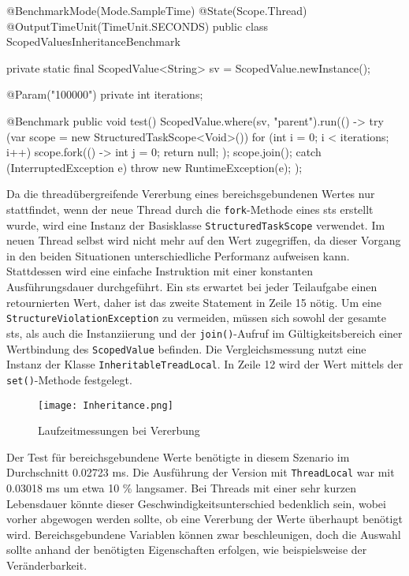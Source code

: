     \begin{program} [H]
        \caption{Laufzeit bei Vererbung}
        \label{prog:Inheritance}
    \begin{JavaCode}[language=Java, numbers=left]
@BenchmarkMode(Mode.SampleTime)
@State(Scope.Thread)
@OutputTimeUnit(TimeUnit.SECONDS)
public class ScopedValuesInheritanceBenchmark {
    private static final ScopedValue<String> sv = ScopedValue.newInstance();

    @Param({"100000"})
    private int iterations;

    @Benchmark
    public void test(){
        ScopedValue.where(sv, "parent").run(() -> {
            try (var scope = new StructuredTaskScope<Void>()) {
                for (int i = 0; i < iterations; i++) 
                    scope.fork(() -> {int j = 0; return null; });
                scope.join();
            } catch (InterruptedException e) {
                throw new RuntimeException(e);
            }
        });
    }
}\end{JavaCode}
    \end{program}
    Da die threadübergreifende Vererbung eines bereichsgebundenen Wertes nur stattfindet, wenn der neue Thread durch die \texttt{fork}-Methode eines \gls{sts} erstellt wurde, wird eine Instanz 
    der Basisklasse \texttt{StructuredTaskScope} verwendet. Im neuen Thread selbst wird nicht mehr auf
    den Wert zugegriffen, da dieser Vorgang in den beiden Situationen unterschiedliche Performanz aufweisen kann. Stattdessen wird eine einfache Instruktion mit einer konstanten Ausführungsdauer
    durchgeführt. Ein \gls{sts} erwartet bei jeder Teilaufgabe einen retournierten Wert, daher ist das zweite Statement in Zeile 15 nötig. Um eine \texttt{StructureViolationException} zu vermeiden,
    müssen sich sowohl der gesamte \gls{sts}, als auch die Instanziierung und der \texttt{join()}-Aufruf im Gültigkeitsbereich einer Wertbindung des \texttt{ScopedValue} befinden.
    Die Vergleichsmessung
    nutzt eine Instanz der Klasse \texttt{InheritableTreadLocal}. In Zeile 12 wird der Wert mittels der \texttt{set()}-Methode festgelegt.

    \begin{figure}[H]
        \centering
        \texttt{[image: Inheritance.png]}
        \caption{Laufzeitmessungen bei Vererbung}
        \label{fig:inheritance}
    \end{figure}

    Der Test für bereichsgebundene Werte benötigte in diesem Szenario im Durchschnitt 0.02723 ms. Die Ausführung der Version mit \texttt{ThreadLocal} war mit 0.03018 ms um etwa 10 \% langsamer. 
    Bei Threads mit einer sehr kurzen Lebensdauer könnte dieser Geschwindigkeitsunterschied bedenklich sein, wobei vorher abgewogen werden sollte, ob eine Vererbung der Werte überhaupt 
    benötigt wird. Bereichsgebundene Variablen können zwar beschleunigen, doch die Auswahl sollte anhand der benötigten Eigenschaften erfolgen, wie beispielsweise der Veränderbarkeit.

